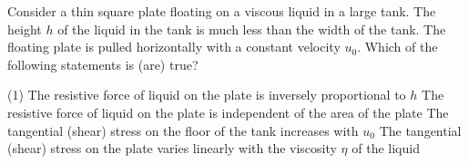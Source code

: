 \item Consider a thin square plate floating on a viscous liquid in a large tank. The height \( h \) of the liquid in the tank is much less than the width of the tank. The floating plate is pulled horizontally with a constant velocity \( u_0 \). Which of the following statements is (are) true?
    \begin{tasks}(1)
        \task The resistive force of liquid on the plate is inversely proportional to \( h \)
        \task The resistive force of liquid on the plate is independent of the area of the plate
        \task The tangential (shear) stress on the floor of the tank increases with \( u_0 \)
        \task The tangential (shear) stress on the plate varies linearly with the viscosity \( \eta \) of the liquid
    \end{tasks}

